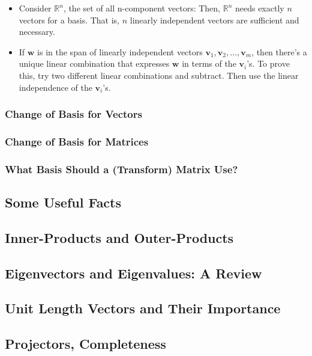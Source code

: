 \documentclass[main.tex]{subfiles}
\begin{document}
\begin{itemize}
        \item Consider $\mathbb{R}^{n}$, the set of all $\mathrm{n}$-component vectors: Then, $\mathbb{R}^{n}$ needs exactly $n$ vectors for a basis. That is, $n$ linearly independent vectors are sufficient and necessary.
        
        \item If $\mathbf{w}$ is in the span of linearly independent vectors $\mathbf{v}_{1}, \mathbf{v}_{2}, \ldots, \mathbf{v}_{m}$, then there's a unique linear combination that expresses $\mathbf{w}$ in terms of the $\mathbf{v}_{i}$'s. To prove this, try two different linear combinations and subtract. Then use the linear independence of the $\mathbf{v}_{i}$'s.
    
    \end{itemize}
    
    \subsubsection{Change of Basis for Vectors}
    
    \subsubsection{Change of Basis for Matrices}
    
    \subsubsection{What Basis Should a (Transform) Matrix Use?}

\subsection{Some Useful Facts}

\subsection{Inner-Products and Outer-Products}

\subsection{Eigenvectors and Eigenvalues: A Review}

\subsection{Unit Length Vectors and Their Importance}

\subsection{Projectors, Completeness}
\end{document}
